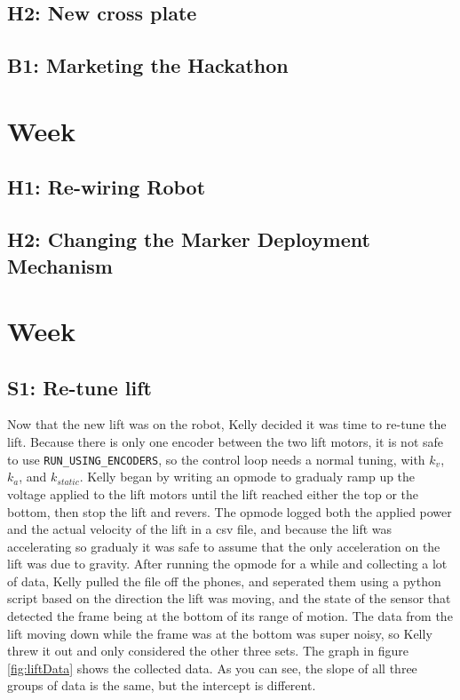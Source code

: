 \documentclass{article}
\begin{document}
\subsection{H2: New cross plate}
 \subsection{B1: Marketing the Hackathon}

\clearpage \newpage \section{Week \thesection} 
\subsection{H1: Re-wiring Robot}

\subsection{H2: Changing the Marker Deployment Mechanism}

\clearpage \newpage \section{Week \thesection} 
\subsection{S1: Re-tune lift}

Now that the new lift was on the robot, Kelly decided it was time to re-tune the lift. Because there is only one encoder between the two lift motors, it is not safe to use \texttt{RUN\_USING\_ENCODERS}, so the control loop needs a normal tuning, with $k_v$, $k_a$, and $k_{static}$. Kelly began by writing an opmode to gradualy ramp up the voltage applied to the lift motors until the lift reached either the top or the bottom, then stop the lift and revers. The opmode logged both the applied power and the actual velocity of the lift in a csv file, and because the lift was accelerating so gradualy it was safe to assume that the only acceleration on the lift was due to gravity. After running the opmode for a while and collecting a lot of data, Kelly pulled the file off the phones, and seperated them using a python script based on the direction the lift was moving, and the state of the sensor that detected the frame being at the bottom of its range of motion. The data from the lift moving down while the frame was at the bottom was super noisy, so Kelly threw it out and only considered the other three sets. The graph in figure \ref{fig:liftData} shows the collected data. As you can see, the slope of all three groups of data is the same, but the intercept is different. 
\end{document}
